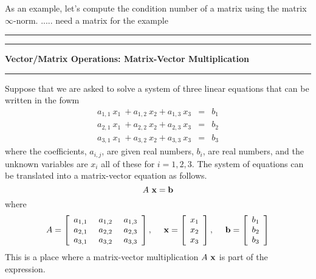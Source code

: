 \documentclass[10pt,fleqn]{article}
\begin{document}
As an example, let's compute the condition number of a matrix using the matrix
$\infty$-norm. ..... need a matrix for the example
\vskip0.1in\hrule\vskip0.1in
\newpage
\vskip0.1in\hrule\vskip0.1in
\noindent
{\bf Vector/Matrix Operations: Matrix-Vector Multiplication}
\vskip0.1in\hrule\vskip0.1in
\noindent
Suppose that we are asked to solve a system of three linear equations that can
be written in the fowm
$$
  \begin{array}{rcl}
    a_{1,1}\ x_1\ + a_{1,2}\ x_2 + a_{1,3}\ x_3 & = & b_1 \\
    a_{2,1}\ x_1\ + a_{2,2}\ x_2 + a_{2,3}\ x_3 & = & b_2 \\
    a_{3,1}\ x_1\ + a_{3,2}\ x_2 + a_{3,3}\ x_3 & = & b_3 
  \end{array}
$$
where the coefficients, $a_{i,j}$, are given real numbers, $b_i$, are real
numbers, and the unknown variables are $x_i$ all of these for $i=1,2,3$. The
system of equations can be translated into a matrix-vector equation as follows.
$$
  A\ {\bf x} = {\bf b}
$$
where
$$
  A = \left[
        \begin{array}{ccc}
          a_{1,1}\ & a_{1,2}\ & a_{1,3} \\
          a_{2,1}\ & a_{2,2}\ & a_{2,3} \\
          a_{3,1}\ & a_{3,2}\ & a_{3,3}
        \end{array}
      \right], \ \ \ \ 
  {\bf x} = \left[
        \begin{array}{c}
          x_1 \\
          x_2 \\
          x_3
        \end{array}
      \right], \ \ \ \ 
  {\bf b} = \left[
        \begin{array}{c}
          b_1 \\
          b_2 \\
          b_3
        \end{array}
      \right]
$$
This is a place where a matrix-vector multiplication $A\ {\bf x}$ is part of the
expression.
\end{document}
